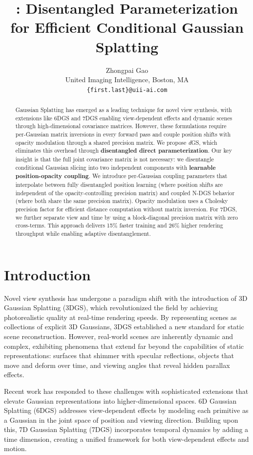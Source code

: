\documentclass{article}
\title{\modelname: Disentangled Parameterization for Efficient Conditional Gaussian Splatting}
\author{
 Zhongpai Gao\\%
United Imaging Intelligence, Boston, MA
\\
\texttt{\{first.last\}@uii-ai.com}
\\
}
\newcommand{\modelname}{\textit{d}GS}
\begin{document}
\maketitle

\begin{abstract}
Gaussian Splatting has emerged as a leading technique for novel view synthesis, with extensions like 6DGS and 7DGS enabling view-dependent effects and dynamic scenes through high-dimensional covariance matrices. However, these formulations require per-Gaussian matrix inversions in every forward pass and couple position shifts with opacity modulation through a shared precision matrix. We propose \modelname{}, which eliminates this overhead through \textbf{disentangled direct parameterization}. Our key insight is that the full joint covariance matrix is not necessary: we disentangle conditional Gaussian slicing into two independent components with \textbf{learnable position-opacity coupling}. We introduce per-Gaussian coupling parameters that interpolate between fully disentangled position learning (where position shifts are independent of the opacity-controlling precision matrix) and coupled N-DGS behavior (where both share the same precision matrix). Opacity modulation uses a Cholesky precision factor for efficient distance computation without matrix inversion. For 7DGS, we further separate view and time by using a block-diagonal precision matrix with zero cross-terms. This approach delivers 15\% faster training and 26\% higher rendering throughput while enabling adaptive disentanglement.
\end{abstract}

\section{Introduction}
\label{sec:introduction}
Novel view synthesis has undergone a paradigm shift with the introduction of 3D Gaussian Splatting (3DGS), which revolutionized the field by achieving photorealistic quality at real-time rendering speeds. By representing scenes as collections of explicit 3D Gaussians, 3DGS established a new standard for static scene reconstruction. However, real-world scenes are inherently dynamic and complex, exhibiting phenomena that extend far beyond the capabilities of static representations: surfaces that shimmer with specular reflections, objects that move and deform over time, and viewing angles that reveal hidden parallax effects.

Recent work has responded to these challenges with sophisticated extensions that elevate Gaussian representations into higher-dimensional spaces. 6D Gaussian Splatting (6DGS) addresses view-dependent effects by modeling each primitive as a Gaussian in the joint space of position and viewing direction. Building upon this, 7D Gaussian Splatting (7DGS) incorporates temporal dynamics by adding a time dimension, creating a unified framework for both view-dependent effects and motion.
\end{document}
